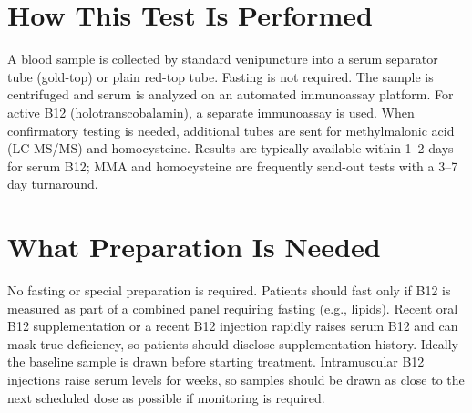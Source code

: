 \section*{How This Test Is Performed}
A blood sample is collected by standard venipuncture into a serum separator tube (gold-top) or plain red-top tube. Fasting is not required. The sample is centrifuged and serum is analyzed on an automated immunoassay platform. For active B12 (holotranscobalamin), a separate immunoassay is used. When confirmatory testing is needed, additional tubes are sent for methylmalonic acid (LC-MS/MS) and homocysteine. Results are typically available within 1--2 days for serum B12; MMA and homocysteine are frequently send-out tests with a 3--7 day turnaround.

\section*{What Preparation Is Needed}
No fasting or special preparation is required. Patients should fast only if B12 is measured as part of a combined panel requiring fasting (e.g., lipids). Recent oral B12 supplementation or a recent B12 injection rapidly raises serum B12 and can mask true deficiency, so patients should disclose supplementation history. Ideally the baseline sample is drawn before starting treatment. Intramuscular B12 injections raise serum levels for weeks, so samples should be drawn as close to the next scheduled dose as possible if monitoring is required.

